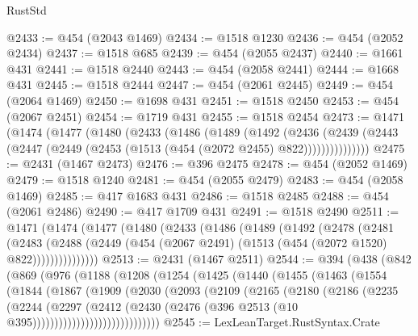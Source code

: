 \begin{lexlean}{RustStd}
\begin{coremodule}
{\begin{coremodule}
{{{{{{{{{{{{{{{{{{{{{{{{{{{{{{{{@2433 := @454 (@2043 @1469)
@2434 := @1518 @1230
@2436 := @454 (@2052 @2434)
@2437 := @1518 @685
@2439 := @454 (@2055 @2437)
@2440 := @1661 @431
@2441 := @1518 @2440
@2443 := @454 (@2058 @2441)
@2444 := @1668 @431
@2445 := @1518 @2444
@2447 := @454 (@2061 @2445)
@2449 := @454 (@2064 @1469)
@2450 := @1698 @431
@2451 := @1518 @2450
@2453 := @454 (@2067 @2451)
@2454 := @1719 @431
@2455 := @1518 @2454
@2473 := @1471
    (@1474
      (@1477
        (@1480
          (@2433
            (@1486
              (@1489
                (@1492
                  (@2436
                    (@2439
                      (@2443 (@2447 (@2449 (@2453 (@1513 (@454 (@2072 @2455) @822)))))))))))))))
@2475 := @2431 (@1467 @2473)
@2476 := @396 @2475
@2478 := @454 (@2052 @1469)
@2479 := @1518 @1240
@2481 := @454 (@2055 @2479)
@2483 := @454 (@2058 @1469)
@2485 := @417 @1683 @431
@2486 := @1518 @2485
@2488 := @454 (@2061 @2486)
@2490 := @417 @1709 @431
@2491 := @1518 @2490
@2511 := @1471
    (@1474
      (@1477
        (@1480
          (@2433
            (@1486
              (@1489
                (@1492
                  (@2478
                    (@2481
                      (@2483
                        (@2488
                          (@2449 (@454 (@2067 @2491) (@1513 (@454 (@2072 @1520) @822)))))))))))))))
@2513 := @2431 (@1467 @2511)
@2544 := @394
    (@438
      (@842
        (@869
          (@976
            (@1188
              (@1208
                (@1254
                  (@1425
                    (@1440
                      (@1455
                        (@1463
                          (@1554
                            (@1844
                              (@1867
                                (@1909
                                  (@2030
                                    (@2093
                                      (@2109
                                        (@2165
                                          (@2180
                                            (@2186
                                              (@2235
                                                (@2244
                                                  (@2297
                                                    (@2412
                                                      (@2430
                                                        (@2476
                                                          (@396
                                                            @2513
                                                            (@10 @395)))))))))))))))))))))))))))))
@2545 := LexLeanTarget.RustSyntax.Crate
}}}}}}}}}}}}}}}}}}}}}}}}}}}}}}}}
\end{coremodule}}
\end{coremodule}
\end{lexlean}
